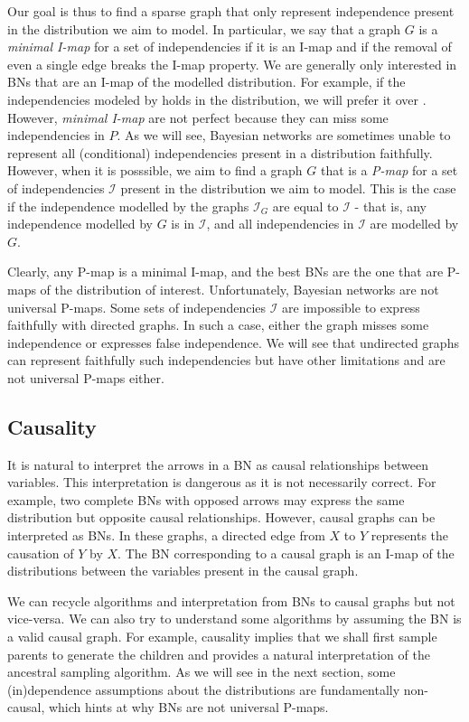 Our goal is thus to find a sparse graph that only represent independence present in the distribution we aim to model. In particular, we say that a graph $G$ is a \textit{minimal I-map} for a set of independencies if it is an I-map and if the removal of even a single edge breaks the I-map property. We are generally only interested in BNs that are an I-map of the modelled distribution. For example, if the independencies modeled by  holds in the distribution, we will prefer it over  . However, \textit{minimal I-map} are not perfect because they can miss some independencies in $P$. As we will see, Bayesian networks are sometimes unable to represent all (conditional) independencies present in a distribution faithfully. However, when it is posssible, we aim to find a graph $G$ that is a \textit{P-map} for a set of independencies $\mathcal{I}$ present in the distribution we aim to model. This is the case if the independence modelled by the graphs $\mathcal{I}_G$ are equal to $\mathcal{I}$ - that is, any independence modelled by $G$ is in $\mathcal{I}$, and all independencies in $\mathcal{I}$ are modelled by $G$.

Clearly, any P-map is a minimal I-map, and the best BNs are the one that are P-maps of the distribution of interest. Unfortunately, Bayesian networks are not universal P-maps. Some sets of independencies $\mathcal{I}$ are impossible to express faithfully with directed graphs. In such a case, either the graph misses some independence or expresses false independence. We will see that undirected graphs can represent faithfully such independencies but have other limitations and are not universal P-maps either.
\subsection{Causality}
It is natural to interpret the arrows in a BN as causal relationships between variables. This interpretation is dangerous as it is not necessarily correct. For example, two complete BNs with opposed arrows may express the same distribution but opposite causal relationships. However, causal graphs can be interpreted as BNs. In these graphs, a directed edge from $X$ to $Y$ represents the causation of $Y$ by $X$. The BN corresponding to a causal graph is an I-map of the distributions between the variables present in the causal graph.

We can recycle algorithms and interpretation from BNs to causal graphs but not vice-versa. We can also try to understand some algorithms by assuming the BN is a valid causal graph. For example, causality implies that we shall first sample parents to generate the children and provides a natural interpretation of the ancestral sampling algorithm. As we will see in the next section, some (in)dependence assumptions about the distributions are fundamentally non-causal, which hints at why BNs are not universal P-maps.

